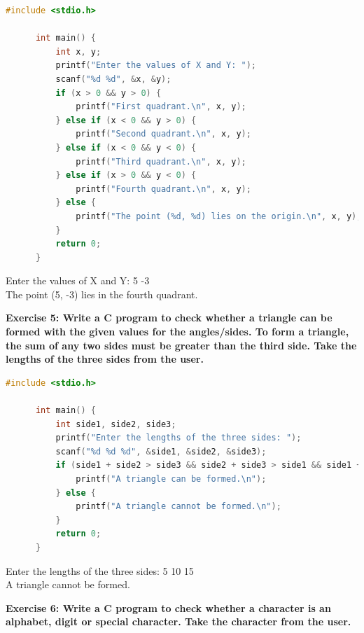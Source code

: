 \documentclass[12pt, openany]{book}
\begin{document}
  \begin{lstlisting}[language=C, caption=Solution to Exercise 4]
      #include <stdio.h>
      
      int main() {
          int x, y;
          printf("Enter the values of X and Y: ");
          scanf("%d %d", &x, &y);
          if (x > 0 && y > 0) {
              printf("First quadrant.\n", x, y);
          } else if (x < 0 && y > 0) {
              printf("Second quadrant.\n", x, y);
          } else if (x < 0 && y < 0) {
              printf("Third quadrant.\n", x, y);
          } else if (x > 0 && y < 0) {
              printf("Fourth quadrant.\n", x, y);
          } else {
              printf("The point (%d, %d) lies on the origin.\n", x, y);
          }
          return 0;
      }
  \end{lstlisting}
  \begin{tcolorbox}[colback=lightgray!10, colframe=black, title=Output]
      Enter the values of X and Y: 5 -3 \\
      The point (5, -3) lies in the fourth quadrant.
  \end{tcolorbox}
  \vspace{10pt}
  \noindent\textbf{Exercise 5: Write a C program to check whether a triangle can be formed with the given values for the angles/sides. To form a triangle, the sum of any two sides must be greater than the third side. Take the lengths of the three sides from the user.}
  
  \begin{lstlisting}[language=C, caption=Solution to Exercise 5]
      #include <stdio.h>
      
      int main() {
          int side1, side2, side3;
          printf("Enter the lengths of the three sides: ");
          scanf("%d %d %d", &side1, &side2, &side3);
          if (side1 + side2 > side3 && side2 + side3 > side1 && side1 + side3 > side2) {
              printf("A triangle can be formed.\n");
          } else {
              printf("A triangle cannot be formed.\n");
          }
          return 0;
      }
  \end{lstlisting}
  \begin{tcolorbox}[colback=lightgray!10, colframe=black, title=Output]
      Enter the lengths of the three sides: 5 10 15 \\
      A triangle cannot be formed.
  \end{tcolorbox}
  \vspace{10pt}
  \noindent\textbf{Exercise 6: Write a C program to check whether a character is an alphabet, digit or special character. Take the character from the user.}
  
\end{document}
